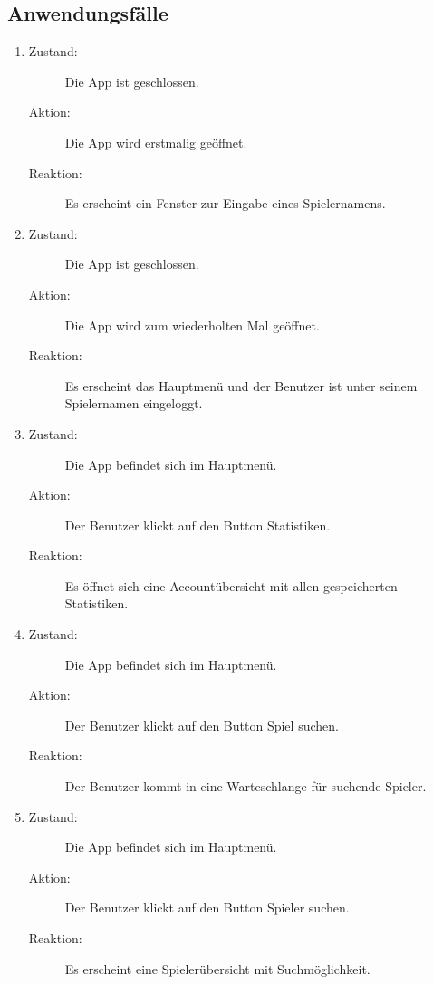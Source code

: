 \documentclass[parskip=full]{scrartcl}
\begin{document}
\subsection{Anwendungsfälle}
\begin{enumerate}
 
    \item
	\begin{description}
	\item[Zustand:] Die App ist geschlossen.
	\item[Aktion:] Die App wird erstmalig geöffnet.
	\item[Reaktion:] Es erscheint ein Fenster zur Eingabe eines Spielernamens.  \\	
	\end{description}
	
	\item
	\begin{description}
	\item[Zustand:] Die App ist geschlossen.
	\item[Aktion:] Die App wird zum wiederholten Mal geöffnet.
	\item[Reaktion:] Es erscheint das Hauptmenü und der Benutzer ist unter seinem Spielernamen eingeloggt. \\
	\end{description}
	
	\item
	\begin{description}
	\item[Zustand:] Die App befindet sich im Hauptmenü.
	\item[Aktion:] Der Benutzer klickt auf den Button \glqq Statistiken\grqq.
	\item[Reaktion:] Es öffnet sich eine Accountübersicht mit allen gespeicherten Statistiken.  \\
	\end{description}
	
	\item
	\begin{description}
	\item[Zustand:] Die App befindet sich im Hauptmenü.
	\item[Aktion:] Der Benutzer klickt auf den Button \glqq Spiel suchen\grqq.
	\item[Reaktion:] Der Benutzer kommt in eine Warteschlange für suchende Spieler.  \\
	\end{description}
	
	\item
	\begin{description}
	\item[Zustand:] Die App befindet sich im Hauptmenü.
	\item[Aktion:] Der Benutzer klickt auf den Button \glqq Spieler suchen\grqq.
	\item[Reaktion:] Es erscheint eine Spielerübersicht mit Suchmöglichkeit.  \\
	\end{description}
	

\end{enumerate}
\end{document}
